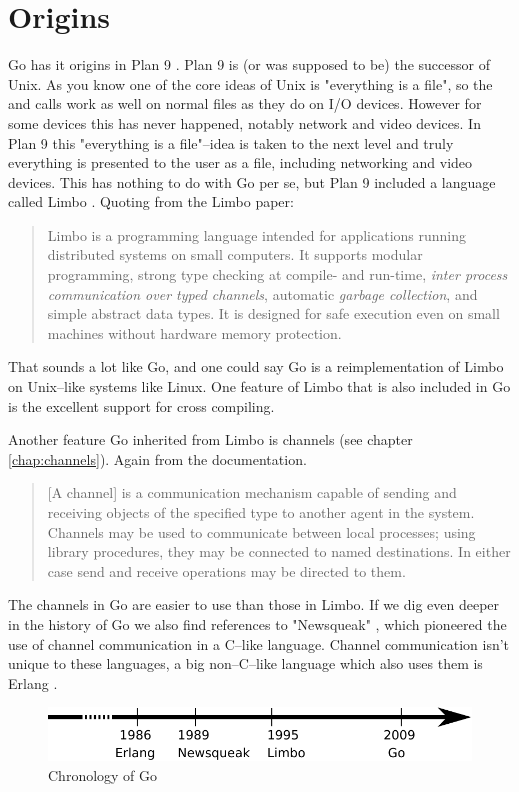\section{Origins}
Go has it origins in Plan 9 \cite{plan9}. Plan 9 is (or was 
supposed to be) the successor of Unix. As you know one of the
core ideas of Unix is "everything is a file", so the  and
 calls work as well on normal files as they do on I/O
devices. However for some devices this has never happened, notably
network and video devices. In Plan 9 this "everything is a file"--idea
is taken to the next level and truly everything is presented to the 
user as a file, including networking and video devices. This has nothing
to do with Go per se, but Plan 9 included a language called Limbo
\cite{limbo}. Quoting from the Limbo paper:
\begin{quote}
Limbo is a programming language intended for applications running
distributed systems on small computers. It supports modular programming,
strong type checking at compile- and run-time, \emph{inter process
communication over typed channels}, automatic \emph{garbage collection}, and
simple abstract data types. It is designed for safe execution even on
small machines without hardware memory protection.
\end{quote}
That sounds a lot like Go, and one could say Go is a reimplementation of
Limbo on Unix--like systems like Linux. One feature of Limbo that is
also included in Go is the excellent support for cross compiling.

Another feature Go inherited from Limbo is channels (see chapter
\ref{chap:channels}). Again from the documentation.
\begin{quote}
[A channel] is a communication mechanism capable of sending and receiving objects of
the specified type to another agent in the system. Channels may be used
to communicate between local processes; using library procedures, they
may be connected to named destinations. In either case send and receive
operations may be directed to them.
\end{quote}
The channels in Go are easier to use than those in Limbo.
If we dig even deeper in the history of Go we also find references
to "Newsqueak" \cite{newsqueak}, which pioneered the use of 
channel communication in a C--like language. Channel
communication isn't unique to these languages, a big non--C--like
language which also uses them is Erlang \cite{erlang}.

\begin{figure}[H]
\caption{Chronology of Go}
\label{fig:chrono-of-go}
\begin{center}
\includegraphics[scale=0.65]{fig/go-history.pdf}
\end{center}
\end{figure}

